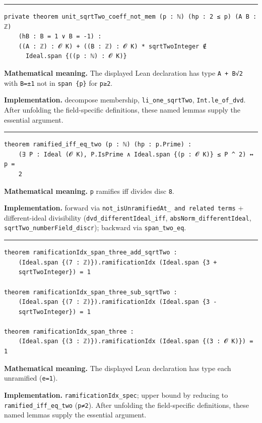 \documentclass[UTF8,a4paper,11pt,fontset=fandol]{ctexart}
\theoremstyle{definition}
\newcommand{\statementsep}{\par\medskip\hrule\medskip}
\begin{document}
\statementsep
\begin{verbatim}
private theorem unit_sqrtTwo_coeff_not_mem (p : ℕ) (hp : 2 ≤ p) (A B : ℤ)
    (hB : B = 1 ∨ B = -1) :
    ((A : ℤ) : 𝓞 K) + ((B : ℤ) : 𝓞 K) * sqrtTwoInteger ∉
      Ideal.span {((p : ℕ) : 𝓞 K)}
\end{verbatim}
\noindent\textbf{Mathematical meaning.} The displayed Lean declaration has type \texttt{A + B√2} with \texttt{B=±1} not in \texttt{span \{p\}} for \texttt{p≥2}.\par
\noindent\textbf{Implementation.} decompose membership, \texttt{li\_\allowbreak{}one\_\allowbreak{}sqrtTwo}, \texttt{Int.\allowbreak{}le\_\allowbreak{}of\_\allowbreak{}dvd}. After unfolding the field-specific definitions, these named lemmas supply the essential argument.\par
\statementsep
\begin{verbatim}
theorem ramified_iff_eq_two (p : ℕ) (hp : p.Prime) :
    (∃ P : Ideal (𝓞 K), P.IsPrime ∧ Ideal.span {(p : 𝓞 K)} ≤ P ^ 2) ↔ p =
    2
\end{verbatim}
\noindent\textbf{Mathematical meaning.} \texttt{p} ramifies iff divides disc \texttt{8}.\par
\noindent\textbf{Implementation.} forward via \texttt{not\_\allowbreak{}isUnramifiedAt\_\allowbreak{} and related terms} + different-ideal divisibility (\texttt{dvd\_\allowbreak{}differentIdeal\_\allowbreak{}iff}, \texttt{absNorm\_\allowbreak{}differentIdeal}, \texttt{sqrtTwo\_\allowbreak{}numberField\_\allowbreak{}discr}); backward via \texttt{span\_\allowbreak{}two\_\allowbreak{}eq}.\par
\statementsep
\begin{verbatim}
theorem ramificationIdx_span_three_add_sqrtTwo :
    (Ideal.span {(7 : ℤ)}).ramificationIdx (Ideal.span {3 +
    sqrtTwoInteger}) = 1

theorem ramificationIdx_span_three_sub_sqrtTwo :
    (Ideal.span {(7 : ℤ)}).ramificationIdx (Ideal.span {3 -
    sqrtTwoInteger}) = 1

theorem ramificationIdx_span_three :
    (Ideal.span {(3 : ℤ)}).ramificationIdx (Ideal.span {(3 : 𝓞 K)}) = 1
\end{verbatim}
\noindent\textbf{Mathematical meaning.} The displayed Lean declaration has type each unramified (\texttt{e=1}).\par
\noindent\textbf{Implementation.} \texttt{ramificationIdx\_\allowbreak{}spec}; upper bound by reducing to \texttt{ramified\_\allowbreak{}iff\_\allowbreak{}eq\_\allowbreak{}two} (\texttt{p≠2}). After unfolding the field-specific definitions, these named lemmas supply the essential argument.\par
\end{document}

